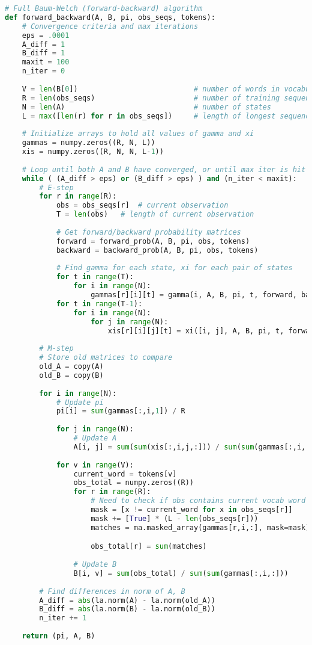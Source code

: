 \documentclass[14pt]{article}
\begin{document}
\begin{lstlisting}[language=Python]
# Full Baum-Welch (forward-backward) algorithm
def forward_backward(A, B, pi, obs_seqs, tokens):
    # Convergence criteria and max iterations
    eps = .0001
    A_diff = 1
    B_diff = 1
    maxit = 100
    n_iter = 0
    
    V = len(B[0])                           # number of words in vocabulary
    R = len(obs_seqs)                       # number of training sequences
    N = len(A)                              # number of states
    L = max([len(r) for r in obs_seqs])     # length of longest sequence
    
    # Initialize arrays to hold all values of gamma and xi
    gammas = numpy.zeros((R, N, L))
    xis = numpy.zeros((R, N, N, L-1))
    
    # Loop until both A and B have converged, or until max iter is hit
    while ( (A_diff > eps) or (B_diff > eps) ) and (n_iter < maxit):
        # E-step
        for r in range(R):
            obs = obs_seqs[r]  # current observation
            T = len(obs)   # length of current observation
            
            # Get forward/backward probability matrices
            forward = forward_prob(A, B, pi, obs, tokens)
            backward = backward_prob(A, B, pi, obs, tokens)
            
            # Find gamma for each state, xi for each pair of states
            for t in range(T):
                for i in range(N):
                    gammas[r][i][t] = gamma(i, A, B, pi, t, forward, backward)
            for t in range(T-1):
                for i in range(N):
                    for j in range(N):
                        xis[r][i][j][t] = xi([i, j], A, B, pi, t, forward, backward, obs, tokens)
        
        # M-step
        # Store old matrices to compare
        old_A = copy(A)
        old_B = copy(B)
        
        for i in range(N):
            # Update pi
            pi[i] = sum(gammas[:,i,1]) / R
            
            for j in range(N):
                # Update A
                A[i, j] = sum(sum(xis[:,i,j,:])) / sum(sum(gammas[:,i,:-1]))
                
            for v in range(V): 
                current_word = tokens[v]
                obs_total = numpy.zeros((R))
                for r in range(R):
                    # Need to check if obs contains current vocab word
                    mask = [x != current_word for x in obs_seqs[r]]
                    mask += [True] * (L - len(obs_seqs[r]))
                    matches = ma.masked_array(gammas[r,i,:], mask=mask)

                    obs_total[r] = sum(matches)
                    
                # Update B
                B[i, v] = sum(obs_total) / sum(sum(gammas[:,i,:]))
        
        # Find differences in norm of A, B
        A_diff = abs(la.norm(A) - la.norm(old_A))
        B_diff = abs(la.norm(B) - la.norm(old_B))
        n_iter += 1
            
    return (pi, A, B)
\end{lstlisting}
\end{document}

